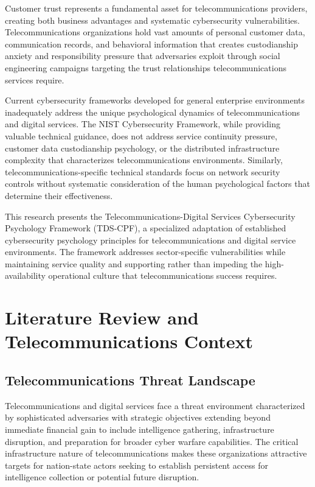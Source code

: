 \documentclass[10pt, twocolumn]{article}
\begin{document}
Customer trust represents a fundamental asset for telecommunications providers, creating both business advantages and systematic cybersecurity vulnerabilities. Telecommunications organizations hold vast amounts of personal customer data, communication records, and behavioral information that creates custodianship anxiety and responsibility pressure that adversaries exploit through social engineering campaigns targeting the trust relationships telecommunications services require.

Current cybersecurity frameworks developed for general enterprise environments inadequately address the unique psychological dynamics of telecommunications and digital services. The NIST Cybersecurity Framework, while providing valuable technical guidance, does not address service continuity pressure, customer data custodianship psychology, or the distributed infrastructure complexity that characterizes telecommunications environments. Similarly, telecommunications-specific technical standards focus on network security controls without systematic consideration of the human psychological factors that determine their effectiveness.

This research presents the Telecommunications-Digital Services Cybersecurity Psychology Framework (TDS-CPF), a specialized adaptation of established cybersecurity psychology principles for telecommunications and digital service environments. The framework addresses sector-specific vulnerabilities while maintaining service quality and supporting rather than impeding the high-availability operational culture that telecommunications success requires.

\section{Literature Review and Telecommunications Context}

\subsection{Telecommunications Threat Landscape}

Telecommunications and digital services face a threat environment characterized by sophisticated adversaries with strategic objectives extending beyond immediate financial gain to include intelligence gathering, infrastructure disruption, and preparation for broader cyber warfare capabilities. The critical infrastructure nature of telecommunications makes these organizations attractive targets for nation-state actors seeking to establish persistent access for intelligence collection or potential future disruption.
\end{document}
